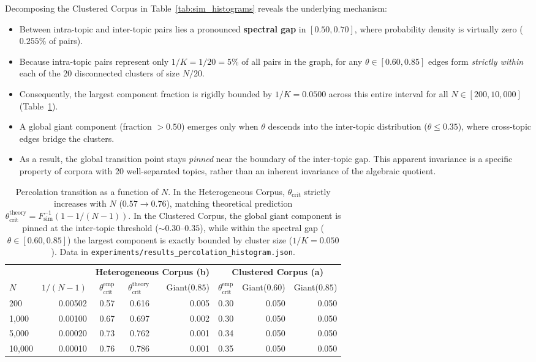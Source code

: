 \documentclass[11pt,a4paper]{article}
\theoremstyle{definition}
\begin{document}
Decomposing the Clustered Corpus in Table~\ref{tab:sim_histograms} reveals the underlying mechanism:
\begin{itemize}
    \item Between intra-topic and inter-topic pairs lies a pronounced \textbf{spectral gap} in $[0.50, 0.70]$, where probability density is virtually zero ($0.255\%$ of pairs).
    \item Because intra-topic pairs represent only $1/K = 1/20 = 5\%$ of all pairs in the graph, for any $\theta \in [0.60, 0.85]$ edges form \emph{strictly within} each of the 20 disconnected clusters of size $N/20$.
    \item Consequently, the largest component fraction is rigidly bounded by $1/K = 0.0500$ across this entire interval for all $N \in [200, 10{,}000]$ (Table~\ref{tab:percolation_sweep}).
    \item A global giant component (fraction $> 0.50$) emerges only when $\theta$ descends into the inter-topic distribution ($\theta \le 0.35$), where cross-topic edges bridge the clusters.
    \item As a result, the global transition point stays \emph{pinned} near the boundary of the inter-topic gap. This apparent invariance is a specific property of corpora with 20 well-separated topics, rather than an inherent invariance of the algebraic quotient.
\end{itemize}

\begin{table}[h]
\centering
\small
\begin{tabular}{lrrrrrrr}
\toprule
& & \multicolumn{3}{c}{\textbf{Heterogeneous Corpus (b)}} & \multicolumn{3}{c}{\textbf{Clustered Corpus (a)}} \\
\cmidrule(lr){3-5} \cmidrule(lr){6-8}
$N$ & $1/(N-1)$ & $\theta_{\mathrm{crit}}^{\mathrm{emp}}$ & $\theta_{\mathrm{crit}}^{\mathrm{theory}}$ & Giant($0.85$) & $\theta_{\mathrm{crit}}^{\mathrm{emp}}$ & Giant($0.60$) & Giant($0.85$) \\
\midrule
200 & 0.00502 & 0.57 & 0.616 & 0.005 & 0.30 & 0.050 & 0.050 \\
1,000 & 0.00100 & 0.67 & 0.697 & 0.002 & 0.30 & 0.050 & 0.050 \\
5,000 & 0.00020 & 0.73 & 0.762 & 0.001 & 0.34 & 0.050 & 0.050 \\
10,000 & 0.00010 & 0.76 & 0.786 & 0.001 & 0.35 & 0.050 & 0.050 \\
\bottomrule
\end{tabular}
\caption{Percolation transition as a function of $N$. In the Heterogeneous Corpus, $\theta_{\mathrm{crit}}$ strictly increases with $N$ ($0.57 \to 0.76$), matching theoretical prediction $\theta_{\mathrm{crit}}^{\mathrm{theory}} = F_{\mathrm{sim}}^{-1}(1 - 1/(N-1))$. In the Clustered Corpus, the global giant component is pinned at the inter-topic threshold ($\sim 0.30$--$0.35$), while within the spectral gap ($\theta \in [0.60, 0.85]$) the largest component is exactly bounded by cluster size ($1/K = 0.050$). Data in \texttt{experiments/results\_percolation\_histogram.json}.}
\label{tab:percolation_sweep}
\end{table}
\end{document}
